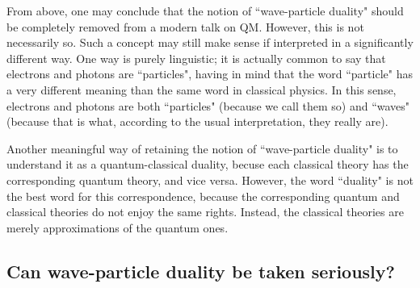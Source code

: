 \documentclass[12pt]{article}
\begin{document}
From above, one may conclude that the notion of ``wave-particle duality"
should be completely removed from a modern talk on QM. 
However, this is not necessarily so. Such a concept may still 
make sense if interpreted in a significantly different way. 
One way is purely linguistic; it is actually common to say that 
electrons and photons are ``particles", having in mind that 
the word ``particle" has a very different meaning than the same 
word in classical physics. In this sense, electrons and photons 
are both ``particles" (because we call them so) and ``waves"
(because that is what, according to the usual interpretation, 
they really are). 

Another meaningful way of retaining the notion of 
``wave-particle duality" is to understand it as a
quantum-classical duality, becuse each classical theory
has the corresponding quantum theory, and vice versa. 
However, the word ``duality" is not the best word for this 
correspondence, because the corresponding quantum and classical theories 
do not enjoy the same rights. Instead, the classical theories 
are merely approximations of the quantum ones.  
 
\subsection{Can wave-particle duality be taken seriously?}
\end{document}
